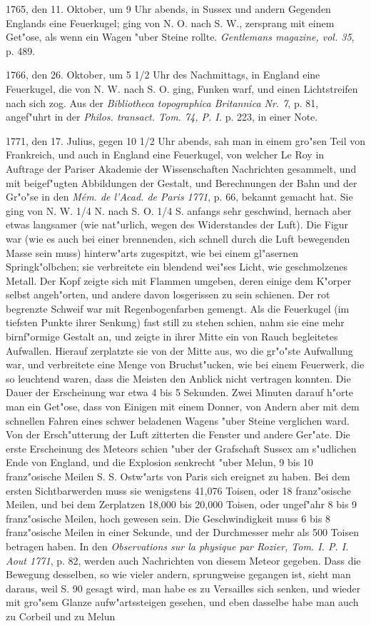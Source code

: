 \documentclass[a4paper, 11pt, oneside, polutonikogreek, german]{article}
\begin{document}
1765, den 11. Oktober, um 9 Uhr abends, in Sussex und andern Gegenden Englands eine Feuerkugel; ging von N. O. nach S. W., zersprang mit einem Get"ose, als wenn ein Wagen "uber Steine rollte. \emph{Gentlemans magazine, vol. 35}, p. 489.

1766, den 26. Oktober, um 5 1/2 Uhr des Nachmittags, in England eine Feuerkugel, die von N. W. nach S. O. ging, Funken warf, und einen Lichtstreifen nach sich zog. Aus der \emph{Bibliotheca topographica Britannica Nr. 7}, p. 81, angef"uhrt in der \emph{Philos. transact. Tom. 74, P. I.} p. 223, in einer Note.

1771, den 17. Julius, gegen 10 1/2 Uhr abends, sah man in einem gro"sen Teil von Frankreich, und auch in England eine Feuerkugel, von welcher Le Roy in Auftrage der Pariser Akademie der Wissenschaften Nachrichten gesammelt, und mit beigef"ugten Abbildungen der Gestalt, und Berechnungen der Bahn und der Gr"o"se in den \emph{Mém. de l'Acad. de Paris 1771}, p. 66, bekannt gemacht hat. Sie ging von N. W. 1/4 N. nach S. O. 1/4 S. anfangs sehr geschwind, hernach aber etwas langsamer (wie nat"urlich, wegen des Widerstandes der Luft). Die Figur war (wie es auch bei einer brennenden, sich schnell durch die Luft bewegenden Masse sein muss) hinterw"arts zugespitzt, wie bei einem gl"asernen Springk"olbchen; sie verbreitete ein blendend wei"ses Licht, wie geschmolzenes Metall. Der Kopf zeigte sich mit Flammen umgeben, deren einige dem K"orper selbst angeh"orten, und andere davon losgerissen zu sein schienen. Der rot begrenzte Schweif war mit Regenbogenfarben gemengt. Als die Feuerkugel (im tiefsten Punkte ihrer Senkung) fast still zu stehen schien, nahm sie eine mehr birnf"ormige Gestalt an, und zeigte in ihrer Mitte ein von Rauch begleitetes Aufwallen. Hierauf zerplatzte sie von der Mitte aus, wo die gr"o"ste Aufwallung war, und verbreitete eine Menge von Bruchst"ucken, wie bei einem Feuerwerk, die so leuchtend waren, dass die Meisten den Anblick nicht vertragen konnten. Die Dauer der Erscheinung war etwa 4 bis 5 Sekunden. Zwei Minuten darauf h"orte man ein Get"ose, dass von Einigen mit einem Donner, von Andern aber mit dem schnellen Fahren eines schwer beladenen Wagens "uber Steine verglichen ward. Von der Ersch"utterung der Luft zitterten die Fenster und andere Ger"ate. Die erste Erscheinung des Meteors schien "uber der Grafschaft Sussex am s"udlichen Ende von England, und die Explosion senkrecht "uber Melun, 9 bis 10 franz"osische Meilen S. S. Ostw"arts von Paris sich ereignet zu haben. Bei dem ersten Sichtbarwerden muss sie wenigstens 41,076 Toisen, oder 18 franz"osische Meilen, und bei dem Zerplatzen 18,000 bis 20,000 Toisen, oder ungef"ahr 8 bis 9 franz"osische Meilen, hoch gewesen sein. Die Geschwindigkeit muss 6 bis 8 franz"osische Meilen in einer Sekunde, und der Durchmesser mehr als 500 Toisen betragen haben. In den \emph{Observations sur la physique par Rozier, Tom. I. P. I. Aout 1771}, p. 82, werden auch Nachrichten von diesem Meteor gegeben. Dass die Bewegung desselben, so wie vieler andern, sprungweise gegangen ist, sieht man daraus, weil S. 90 gesagt wird, man habe es zu Versailles sich senken, und wieder mit gro"sem Glanze aufw"artssteigen gesehen, und eben dasselbe habe man auch zu Corbeil und zu Melun 
\end{document}
